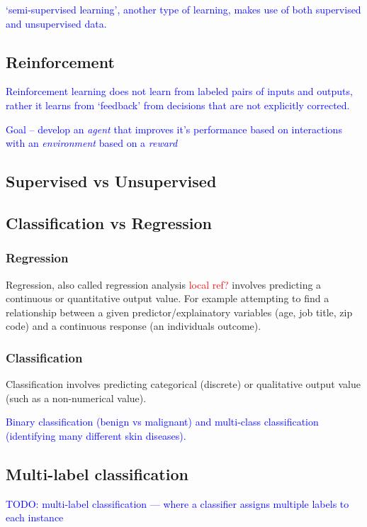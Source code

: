 \textcolor{blue}{`semi-supervised learning', another type of learning, makes use of both supervised and unsupervised data.}

\subsection{Reinforcement}

\textcolor{blue}{Reinforcement learning does not learn from labeled pairs of inputs and outputs, rather it learns from `feedback' from decisions that are not explicitly corrected.}

\textcolor{blue}{Goal -- develop an \emph{agent} that improves it's performance based on interactions with an \emph{environment} based on a \emph{reward}}

\subsection{Supervised vs Unsupervised}

\subsection{Classification vs Regression}

\subsubsection{Regression} 

Regression, also called regression analysis \textcolor{red}{local ref?} involves predicting a continuous or quantitative output value. For example attempting to find a relationship between a given predictor/explainatory variables (age, job title, zip code) and a continuous response (an individuals outcome).

\subsubsection{Classification} 

Classification involves predicting categorical (discrete) or qualitative output value (such as a non-numerical value). 

\textcolor{blue}{Binary classification (benign vs malignant) and multi-class classification (identifying many different skin diseases).}

\subsection{Multi-label classification}
\textcolor{blue}{TODO: {multi-label classification} --- where a classifier assigns multiple labels to each instance}

